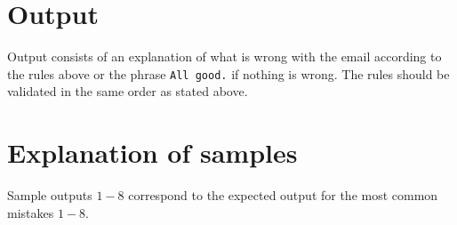 \section*{Output}
Output consists of an explanation of what is wrong with the email according to the rules above
or the phrase \texttt{All good.} if nothing is wrong.
The rules should be validated in the same order as stated above.

\section*{Explanation of samples}
Sample outputs $1-8$ correspond to the expected output for the most common mistakes $1-8$.
